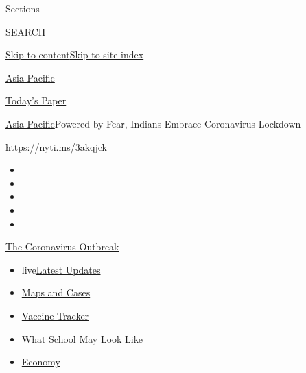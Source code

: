 Sections

SEARCH

\protect\hyperlink{site-content}{Skip to
content}\protect\hyperlink{site-index}{Skip to site index}

\href{https://www.nytimes.com/section/world/asia}{Asia Pacific}

\href{https://myaccount.nytimes.com/auth/login?response_type=cookie\&client_id=vi}{}

\href{https://www.nytimes.com/section/todayspaper}{Today's Paper}

\href{/section/world/asia}{Asia Pacific}\textbar{}Powered by Fear,
Indians Embrace Coronavirus Lockdown

\url{https://nyti.ms/3akqjck}

\begin{itemize}
\item
\item
\item
\item
\item
\end{itemize}

\href{https://www.nytimes.com/news-event/coronavirus?action=click\&pgtype=Article\&state=default\&region=TOP_BANNER\&context=storylines_menu}{The
Coronavirus Outbreak}

\begin{itemize}
\tightlist
\item
  live\href{https://www.nytimes.com/2020/08/02/world/coronavirus-updates.html?action=click\&pgtype=Article\&state=default\&region=TOP_BANNER\&context=storylines_menu}{Latest
  Updates}
\item
  \href{https://www.nytimes.com/interactive/2020/us/coronavirus-us-cases.html?action=click\&pgtype=Article\&state=default\&region=TOP_BANNER\&context=storylines_menu}{Maps
  and Cases}
\item
  \href{https://www.nytimes.com/interactive/2020/science/coronavirus-vaccine-tracker.html?action=click\&pgtype=Article\&state=default\&region=TOP_BANNER\&context=storylines_menu}{Vaccine
  Tracker}
\item
  \href{https://www.nytimes.com/interactive/2020/07/29/us/schools-reopening-coronavirus.html?action=click\&pgtype=Article\&state=default\&region=TOP_BANNER\&context=storylines_menu}{What
  School May Look Like}
\item
  \href{https://www.nytimes.com/live/2020/07/31/business/stock-market-today-coronavirus?action=click\&pgtype=Article\&state=default\&region=TOP_BANNER\&context=storylines_menu}{Economy}
\end{itemize}

